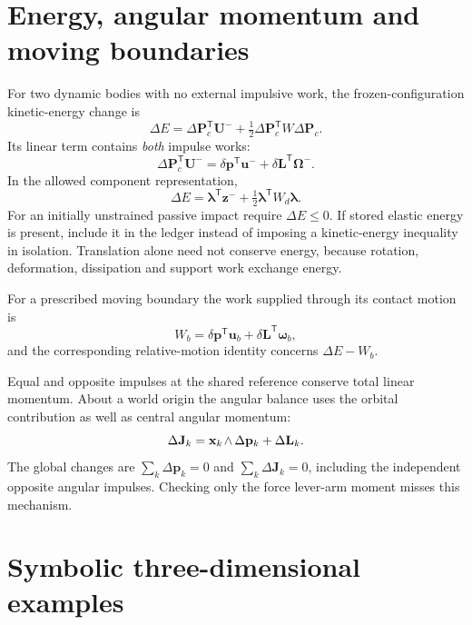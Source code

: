 \documentclass[11pt,a4paper]{article}
\newcommand{\rw}[1]{\mathord{#1\mkern2mu\wedge}}
\begin{document}
\section{Energy, angular momentum and moving boundaries}
For two dynamic bodies with no external impulsive work, the frozen-configuration kinetic-energy change is
\begin{equation}
\boxed{\Delta E=\Delta\mathbf{P}_c^{\mathsf T}\mathbf{U}^-
+\tfrac12\Delta\mathbf{P}_c^{\mathsf T}W\Delta\mathbf{P}_c}.
\end{equation}
Its linear term contains \emph{both} impulse works:
\begin{equation}
\Delta\mathbf{P}_c^{\mathsf T}\mathbf{U}^-
=\delta \mathbf{p}^{\mathsf T}\mathbf{u}^-
+\delta \mathbf{L}^{\mathsf T}\boldsymbol{\Omega}^-.
\end{equation}
In the allowed component representation,
\begin{equation}
\boxed{\Delta E=\boldsymbol{\lambda}^{\mathsf T}\mathbf{z}^-
+\tfrac12\boldsymbol{\lambda}^{\mathsf T}W_d\boldsymbol{\lambda}}.
\end{equation}
For an initially unstrained passive impact require $\Delta E\le0$. If stored elastic energy is present, include it in the ledger instead of imposing a kinetic-energy inequality in isolation. Translation alone need not conserve energy, because rotation, deformation, dissipation and support work exchange energy.

For a prescribed moving boundary the work supplied through its contact motion is
\begin{equation}
W_b=\delta \mathbf{p}^{\mathsf T}\mathbf{u}_b
+\delta \mathbf{L}^{\mathsf T}\boldsymbol{\omega}_b,
\end{equation}
and the corresponding relative-motion identity concerns $\Delta E-W_b$.

Equal and opposite impulses at the shared reference conserve total linear momentum. About a world origin the angular balance uses the orbital contribution as well as central angular momentum:
\begin{equation}
\Delta \mathbf{J}_k=\rw{\mathbf{x}_k}\,\Delta \mathbf{p}_k+\Delta \mathbf{L}_k.
\end{equation}
The global changes are $\sum_k\Delta\mathbf{p}_k=0$ and $\sum_k\Delta\mathbf{J}_k=0$, including the independent opposite angular impulses. Checking only the force lever-arm moment misses this mechanism.

\section{Symbolic three-dimensional examples}
\end{document}
